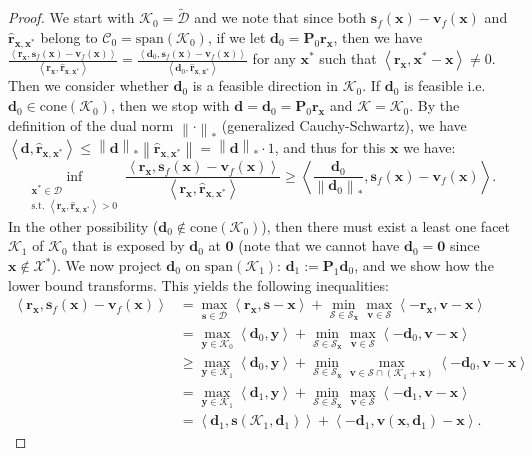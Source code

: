 \documentclass{article} %
\providecommand{\norm}[1]{\left\lVert#1\right\rVert}
\providecommand{\dualnorm}[1]{\norm{#1}_*}
\newcommand{\X}{\mathcal{X}}
\newcommand{\domain}{\mathcal{D}}
\newcommand{\x}{\bm{x}}
\newcommand{\y}{\bm{y}}
\newcommand{\s}{\bm{s}}
\newcommand{\dd}{\bm{d}}
\newcommand{\vv}{\bm{v}} %
\renewcommand{\S}{\mathcal{S}}
\renewcommand{\r}{\bm{r}}
\newcommand{\innerProd}[2]{\left\langle #1 , #2 \right\rangle}
\newcommand{\C}{\mathcal{C}}
\newcommand{\proj}{\bm{P}}
\newcommand{\Kface}{\mathcal{K}}
\newcommand{\0}{\mathbf{0}} %
\begin{document}
\begin{proof}
We start with $\Kface_0 = \tilde{\domain}$ and we note that since both $\s_f(\x) - \vv_f(\x)$ and $\hat{\r}_{\x,\x^*}$ belong to $\C_0 = \text{span}(\Kface_0)$, if we let $\dd_0 = \proj_0 \r_{\x}$, then we have $\frac{\innerProd{\r_{\x}}{ \s_f(\x) - \vv_f(\x)}}{\innerProd{\r_{\x}}{ \hat{\r}_{\x,\x^*}}} = \frac{\innerProd{\dd_0}{ \s_f(\x) - \vv_f(\x)}}{\innerProd{\dd_0}{ \hat{\r}_{\x,\x^*}}}$ for any $\x^*$ such that $\innerProd{\r_{\x}}{\x^*-\x} \neq 0$. Then we consider whether $\dd_0$ is a feasible direction in $\Kface_0$. If $\dd_0$ is feasible i.e. $\dd_0 \in \text{cone}(\Kface_0)$, then we stop with $\dd = \dd_0 = \proj_0 \r_{\x}$ and $\Kface = \Kface_0$. By the definition of the dual norm $\dualnorm{\cdot}$ (generalized Cauchy-Schwartz), we have $\innerProd{\dd}{ \hat{\r}_{\x,\x^*}} \leq \dualnorm{\dd}\norm{\hat{\r}_{\x,\x^*}} = \dualnorm{\dd} \cdot 1$, and thus for this $\x$ we have:
\[ 
	\inf_{\substack{\x^* \in \domain\\
               \textrm{s.t. } \innerProd{\r_{\x}}{ \hat{\r}_{\x,\x^*}} > 0}}
                       \frac{\innerProd{\r_{\x}}{ \s_f(\x) - \vv_f(\x)}}{\innerProd{\r_{\x}}{ \hat{\r}_{\x,\x^*}}} \geq  \innerProd{\frac{\dd_0}{\dualnorm{\dd_0}}}{ \s_f(\x) - \vv_f(\x)} .
\]
In the other possibility ($\dd_0 \notin \text{cone}(\Kface_0)$), then there must exist a least one facet $\Kface_1$ of $\Kface_0$ that is exposed by $\dd_0$ at $\0$ (note that we cannot have $\dd_0 = \0$ since $\x \notin \X^*$). %
%
%
%
%
%
We now project $\dd_0$ on $\text{span}(\Kface_1)$: $\dd_1 := \proj_1 \dd_0$, and we show how the lower bound transforms.
This yields the following inequalities:
\begin{align}
\innerProd{\r_{\x}}{ \s_f(\x) - \vv_f(\x)}  &= 
	 \max_{\s \in \domain} \innerProd{\r_{\x}}{ \s - \x} +
	 \min_{\S \in \S_{\x}} \max_{\vv \in \S} \innerProd{-\r_{\x}}{ \vv - \x}  \nonumber \\
	 &= \max_{\y \in \Kface_0} \innerProd{\dd_0}{ \y } +
	 	 \min_{\S \in \S_{\x}} \max_{\vv \in \S} \innerProd{-\dd_0}{ \vv - \x} \nonumber \\
	 &\ge \max_{\y \in \Kface_1} \innerProd{\dd_0}{ \y } +
	 	 	 \min_{\S \in \S_{\x}} \max_{\vv \in \S \cap (\Kface_1 + \x)} \innerProd{-\dd_0}{ \vv - \x} \nonumber \\
	 &= \max_{\y \in \Kface_1} \innerProd{\dd_1}{ \y } +
	 	 	 \min_{\S \in \S_{\x}} \max_{\vv \in \S } \innerProd{-\dd_1}{ \vv - \x} \nonumber \\
	 &= \innerProd{\dd_1}{\s(\Kface_1, \dd_1)} + \innerProd{-\dd_1}{ \vv(\x, \dd_1) - \x} . \label{eq:d1sf}

\end{align}
\end{proof}
\end{document}
